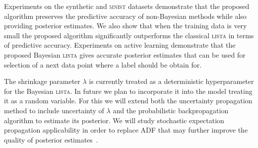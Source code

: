 \documentclass[letterpaper]{article}
\begin{document}
Experiments on the synthetic and \textsc{mnist} datasets demonstrate that the proposed algorithm preserves the predictive accuracy of non-Bayesian methods while also providing posterior estimates. We also show that when the training data is very small the proposed algorithm significantly outperforms the classical \textsc{lista} in terms of predictive accuracy. Experiments on active learning demonstrate that the proposed Bayesian \textsc{lista} gives accurate posterior estimates that can be used for selection of a next data point where a label should be obtain for.

The shrinkage parameter $\lambda$ is currently treated as a deterministic hyperparameter for the Bayesian \textsc{lista}. In future we plan to incorporate it into the model treating it as a random variable. For this we will extend both the uncertainty propagation method to include uncertainty of $\lambda$ and the probabilistic backpropagation algorithm to estimate its posterior. We will study stochastic expectation propagation applicability in order to replace ADF that may further improve the quality of posterior estimates~\citep{li2015stochastic}.



\end{document}
